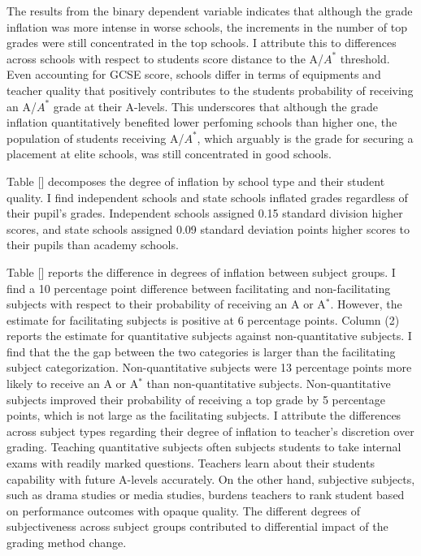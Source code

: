 The results from the binary dependent variable indicates that although the grade inflation was more intense in worse schools, the increments in the number of top grades were still concentrated in the top schools. I attribute this to differences across schools with respect to students score distance to the A/$A^*$ threshold. Even accounting for GCSE score, schools differ in terms of equipments and teacher quality that positively contributes to the students probability of receiving an A/$A^*$ grade at their A-levels. This underscores that although the grade inflation quantitatively benefited lower perfoming schools than higher one, the population of students receiving A/$A^*$, which arguably is the grade for securing a placement at elite schools, was still concentrated in good schools.

Table [] decomposes the degree of inflation by school type and their student quality. I find independent schools and state schools inflated grades regardless of their pupil's grades. Independent schools assigned 0.15 standard division higher scores, and state schools assigned 0.09 standard deviation points higher scores to  their pupils than academy schools. 

Table [] reports the difference in degrees of inflation between subject groups. I find a 10 percentage point difference between facilitating and non-facilitating subjects with respect to their probability of receiving an A or A$^*$. However, the estimate for facilitating subjects is positive at 6 percentage points. Column (2) reports the estimate for quantitative subjects against non-quantitative subjects. I find that the the gap between the two categories is larger than the facilitating subject categorization. Non-quantitative subjects were 13 percentage points more likely to receive an A or A$^*$ than non-quantitative subjects. Non-quantitative subjects improved their probability of receiving a top grade by 5 percentage points, which is not large as the facilitating subjects. I attribute the differences across subject types regarding their degree of inflation to teacher's discretion over grading. Teaching quantitative subjects often subjects students to take internal exams with readily marked questions. Teachers learn about their students capability with future A-levels accurately. On the other hand, subjective subjects, such as drama studies or media studies, burdens teachers to rank student based on performance outcomes with opaque quality. The different degrees of subjectiveness across subject groups contributed to differential impact of the grading method change.

